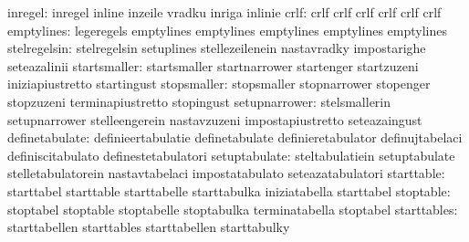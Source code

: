                          inregel: inregel                          inline
                                  inzeile                          vradku
                                  inriga                           inlinie
                            crlf: crlf                             crlf
                                  crlf                             crlf
                                  crlf                             crlf
emptylines: legeregels emptylines
            emptylines emptylines
            emptylines emptylines
                    stelregelsin: stelregelsin                     setuplines
                                  stellezeilenein                  nastavradky
                                  impostarighe                     seteazalinii
                    startsmaller: startsmaller                     startnarrower
                                  startenger                       startzuzeni
                                  iniziapiustretto                 startingust
                     stopsmaller: stopsmaller                      stopnarrower
                                  stopenger                        stopzuzeni
                                  terminapiustretto                stopingust
                   setupnarrower: stelsmallerin                    setupnarrower
                                  stelleengerein                   nastavzuzeni
                                  impostapiustretto                seteazaingust
                  definetabulate: definieertabulatie               definetabulate
                                  definieretabulator               definujtabelaci
                                  definiscitabulato                definestetabulatori
                   setuptabulate: steltabulatiein                  setuptabulate
                                  stelletabulatorein               nastavtabelaci
                                  impostatabulato                  seteazatabulatori
                      starttable: starttabel                       starttable
                                  starttabelle                     starttabulka
                                  iniziatabella                    starttabel
                       stoptable: stoptabel                        stoptable
                                  stoptabelle                      stoptabulka
                                  terminatabella                   stoptabel
                     starttables: starttabellen                    starttables
                                  starttabellen                    starttabulky
